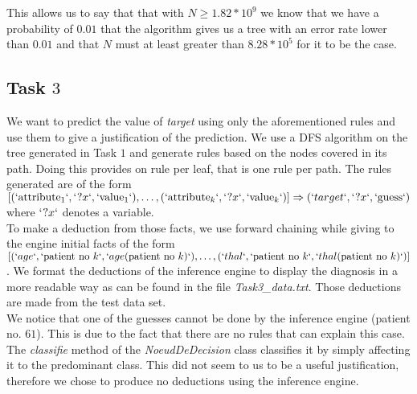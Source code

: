 \documentclass[9pt]{extarticle}
\begin{document}
	
	

	

This allows us to say that that with $N\geq1.82*10^9$ we know that we have a probability of $0.01$ that the algorithm gives us a tree with an error rate lower than $0.01$ and that $N$ must at least greater than $8.28*10^5$ for it to be the case.

\subsection{Task $3$}
	We want to predict the value of \emph{target} using only the aforementioned rules and use them to give a justification of the prediction.
	We use a DFS algorithm on the tree generated in Task $1$ and generate rules based on the nodes covered in its path. Doing this provides on rule per leaf, that is one rule per path. The rules generated are of the form $ [(`\mathrm{attribute}_1`,` ?x`, `\mathrm{value}_1`),\ldots,(`\mathrm{attribute}_k`,` ?x`, `\mathrm{value}_k`)]\Rightarrow(`target`, `?x` , `\mathrm{guess}`)$ where $`?x`$ denotes a variable.\\
	To make a deduction from those facts, we use forward chaining while giving to the engine initial facts of the form $[(`age`, `\mathrm{patient\ no}\ k`, `age(\mathrm{patient\ no}\ k)`),\ldots,(`thal`, `\mathrm{patient\ no}\ k`, `thal(\mathrm{patient\ no}\ k)`)]$. We format the deductions of the inference engine to display the diagnosis in a more readable way as can be found in the file \emph{Task3\_data.txt}. Those deductions are made from the test data set.\\
	We notice that one of the guesses cannot be done by the inference engine (patient no. $61$). This is due to the fact that there are no rules that can explain this case. The \emph{classifie} method of the \emph{NoeudDeDecision} class classifies it by simply affecting it to the predominant class. This did not seem to us to be a useful justification, therefore we chose to produce no deductions using the inference engine.
	
\end{document}

